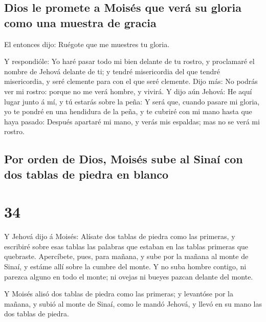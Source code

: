 \hypertarget{dios-le-promete-a-moisuxe9s-que-veruxe1-su-gloria-como-una-muestra-de-gracia}{%
\subsection{Dios le promete a Moisés que verá su gloria como una muestra
de
gracia}\label{dios-le-promete-a-moisuxe9s-que-veruxe1-su-gloria-como-una-muestra-de-gracia}}

 El entonces dijo: Ruégote que me muestres tu gloria.

 Y respondióle: Yo haré pasar todo mi bien delante de tu
rostro, y proclamaré el nombre de Jehová delante de ti; y tendré
misericordia del que tendré misericordia, y seré clemente para con el
que seré clemente.  Dijo más: No podrás ver mi rostro:
porque no me verá hombre, y vivirá.  Y dijo aún Jehová:
He aquí lugar junto á mí, y tú estarás sobre la peña:  Y
será que, cuando pasare mi gloria, yo te pondré en una hendidura de la
peña, y te cubriré con mi mano hasta que haya pasado: 
Después apartaré mi mano, y verás mis espaldas; mas no se verá mi
rostro.

\hypertarget{por-orden-de-dios-moisuxe9s-sube-al-sinauxed-con-dos-tablas-de-piedra-en-blanco}{%
\subsection{Por orden de Dios, Moisés sube al Sinaí con dos tablas de
piedra en
blanco}\label{por-orden-de-dios-moisuxe9s-sube-al-sinauxed-con-dos-tablas-de-piedra-en-blanco}}

\hypertarget{section-02-34}{%
\section{34}\label{section-02-34}}

 Y Jehová dijo á Moisés: Alísate dos tablas de piedra como
las primeras, y escribiré sobre esas tablas las palabras que estaban en
las tablas primeras que quebraste.  Apercíbete, pues, para
mañana, y sube por la mañana al monte de Sinaí, y estáme allí sobre la
cumbre del monte.  Y no suba hombre contigo, ni parezca
alguno en todo el monte; ni ovejas ni bueyes pazcan delante del monte.

 Y Moisés alisó dos tablas de piedra como las primeras; y
levantóse por la mañana, y subió al monte de Sinaí, como le mandó
Jehová, y llevó en su mano las dos tablas de piedra.

